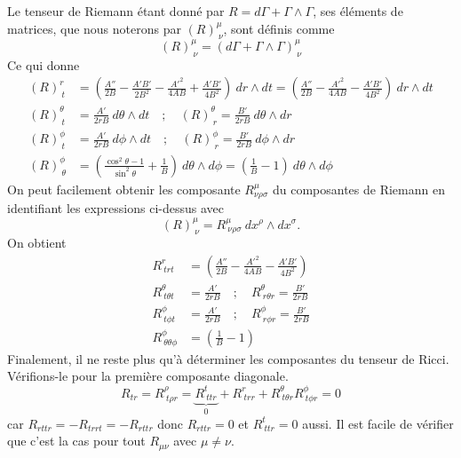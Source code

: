 \documentclass[a4paper,11pt]{report}
\begin{document}
        Le tenseur de Riemann étant donné par $R=d\Gamma+\Gamma\wedge\Gamma$, ses éléments de matrices, que nous noterons par $(R)^\mu_{~\nu}$, sont définis comme
        \begin{equation}
            (R)^\mu_{~\nu} = (d\Gamma+\Gamma\wedge\Gamma)^\mu_{~\nu}
        \end{equation}
        Ce qui donne
        \begin{align}
            (R)^r_{~t} &= \left( \frac{A''}{2B}-\frac{A'B'}{2B^2}-\frac{A'^2}{4AB}+\frac{A'B'}{4B^2} \right)~dr\wedge dt = \left( \frac{A''}{2B}-\frac{A'^2}{4AB}-\frac{A'B'}{4B^2} \right)~dr\wedge dt\\
            (R)^\theta_{~t} &= \frac{A'}{2rB}~d\theta\wedge dt\quad;\quad  (R)^\theta_{~r} = \frac{B'}{2rB}~d\theta\wedge dr\\
            (R)^\phi_{~t} &= \frac{A'}{2rB}~d\phi\wedge dt \quad;\quad (R)^\phi_{~r} = \frac{B'}{2rB}~d\phi\wedge dr\\
            (R)^\phi_{~\theta} &= \left( \frac{\cos^2\theta-1}{\sin^2\theta}+\frac{1}{B} \right)~d\theta\wedge d\phi = \left( \frac{1}{B}-1 \right)~d\theta\wedge d\phi
        \end{align}
        On peut facilement obtenir les composante $R^\mu_{\nu\rho\sigma}$ du composantes de Riemann en identifiant les expressions ci-dessus avec
        \begin{equation}
            (R)^\mu_{~\nu} = R^\mu_{~\nu\rho\sigma}~dx^\rho\wedge dx^\sigma.
        \end{equation}
        On obtient
        \begin{align}
            R^r_{~trt} &= \left( \frac{A''}{2B}-\frac{A'^2}{4AB}-\frac{A'B'}{4B^2} \right)\\
            R^\theta_{~t\theta t} &= \frac{A'}{2rB}\quad;\quad  R^\theta_{~r\theta r} = \frac{B'}{2rB}\\
            R^\phi_{~t\phi t} &= \frac{A'}{2rB} \quad;\quad R^\phi_{~r\phi r} = \frac{B'}{2rB}\\
            R^\phi_{~\theta\theta\phi} &= \left( \frac{1}{B}-1 \right)
        \end{align}
        Finalement, il ne reste plus qu'à déterminer les composantes du tenseur de Ricci. Vérifions-le pour la première composante diagonale.
        \begin{equation}
            R_{tr} = R^\rho_{~t\rho r} = \underbrace{R^t_{~tt r}}_{0}+R^r_{~trr}+R^\theta_{~t\theta r}R^\phi_{~t\phi r} = 0
        \end{equation}
        car $R_{rttr} = -R_{trrt} = -R_{rttr}$ donc $R_{rttr} = 0$ et $R^t_{~tt r} = 0$ aussi. Il est facile de vérifier que c'est la cas pour tout $R_{\mu\nu}$ avec $\mu\neq\nu$.\\
\end{document}

